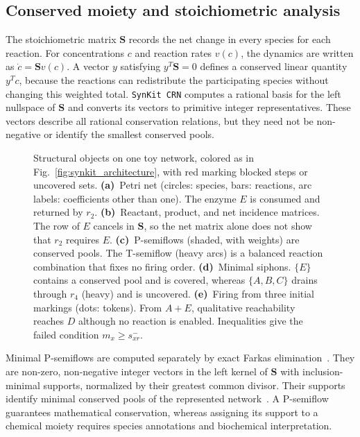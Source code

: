 \documentclass[10pt,a4paper,fleqn]{article}
\newcommand{\synkitcrn}{\texttt{SynKit CRN}\xspace}
\begin{document}
\subsection{Conserved moiety and stoichiometric analysis}
\label{sec:analysis}

The stoichiometric matrix $\mathbf S$ records the net change in every species for each reaction. For concentrations $c$ and reaction rates $v(c)$, the dynamics are written as $\dot c=\mathbf S v(c)$. A vector $y$ satisfying $y^T\mathbf S=0$ defines a conserved linear quantity $y^Tc$, because the reactions can redistribute the participating species without changing this weighted total. \synkitcrn computes a rational basis for the left nullspace of $\mathbf S$ and converts its vectors to primitive integer representatives. These vectors describe all rational conservation relations, but they need not be non-negative or identify the smallest conserved pools.

\begin{figure}[!htbp]
\centering

\caption{Structural objects on one toy network, colored as in Fig.~\ref{fig:synkit_architecture}, with red marking blocked steps or uncovered sets. \textbf{(a)}~Petri net (circles: species, bars: reactions, arc labels: coefficients other than one). The enzyme $E$ is consumed and returned by $r_2$. \textbf{(b)}~Reactant, product, and net incidence matrices. The row of $E$ cancels in $\mathbf S$, so the net matrix alone does not show that $r_2$ requires $E$. \textbf{(c)}~P-semiflows (shaded, with weights) are conserved pools. The T-semiflow (heavy arcs) is a balanced reaction combination that fixes no firing order. \textbf{(d)}~Minimal siphons. $\{E\}$ contains a conserved pool and is covered, whereas $\{A,B,C\}$ drains through $r_4$ (heavy) and is uncovered. \textbf{(e)}~Firing from three initial markings (dots: tokens). From $A+E$, qualitative reachability reaches $D$ although no reaction is enabled. Inequalities give the failed condition $m_x\ge s^-_{xr}$.}
\label{fig:concepts}
\end{figure}

Minimal P-semiflows are computed separately by exact Farkas elimination~\cite{colom1991convex}. They are non-zero, non-negative integer vectors in the left kernel of $\mathbf S$ with inclusion-minimal supports, normalized by their greatest common divisor. Their supports identify minimal conserved pools of the represented network~\cite{famili2003leftnullspace}. A P-semiflow guarantees mathematical conservation, whereas assigning its support to a chemical moiety requires species annotations and biochemical interpretation.
\end{document}
